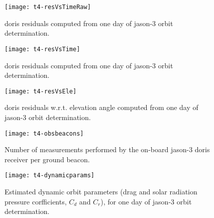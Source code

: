 \begin{figure}
    \centering
    \texttt{[image: t4-resVsTimeRaw]}
    \caption{\gls{doris} residuals computed from one day of \gls{jason}-3 orbit determination.}
    \label{fig:ResVsTimeRaw}
\end{figure}

\begin{figure}
    \centering
    \texttt{[image: t4-resVsTime]}
    \caption{\gls{doris} residuals computed from one day of \gls{jason}-3 orbit determination.}
    \label{fig:ResVsTime}
\end{figure}

\begin{figure}
    \centering
    \texttt{[image: t4-resVsEle]}
    \caption{\gls{doris} residuals w.r.t. elevation angle computed from one day of \gls{jason}-3 orbit determination.}
    \label{fig:ResVsEle}
\end{figure}

\begin{figure}
    \centering
    \texttt{[image: t4-obsbeacons]}
    \caption{Number of measurements performed by the on-board \gls{jason}-3 \gls{doris} receiver per ground beacon.}
    \label{fig:obsPerBeacon}
\end{figure}

\begin{figure}
    \centering
    \texttt{[image: t4-dynamicparams]}
    \caption{Estimated dynamic orbit parameters (drag and solar radiation pressure corfficients, $C_d$ and $C_r$), for one day of \gls{jason}-3 orbit determination.}
    \label{fig:EstimDynamicParams}
\end{figure}
